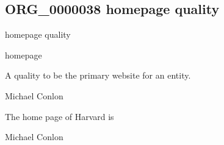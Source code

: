 \documentclass[letterpaper,10pt,english]{sphinxmanual}
\begin{document}
\subsection{ORG\_0000038 \sphinxhyphen{} homepage quality}
\label{\detokenize{doc-ORG_0000038:org-0000038-homepage-quality}}\label{\detokenize{doc-ORG_0000038:index-0}}\label{\detokenize{doc-ORG_0000038::doc}}
\begin{sphinxShadowBox}

\sphinxAtStartPar
homepage quality
\end{sphinxShadowBox}

\begin{sphinxShadowBox}

\sphinxAtStartPar
homepage
\end{sphinxShadowBox}

\begin{sphinxShadowBox}

\sphinxAtStartPar
{\hyperref[\detokenize{doc-BFO_0000019::doc}]{}}
\end{sphinxShadowBox}

\begin{sphinxShadowBox}

\sphinxAtStartPar
A quality to be the primary website for an entity.
\end{sphinxShadowBox}

\begin{sphinxShadowBox}

\sphinxAtStartPar
Michael Conlon 
\end{sphinxShadowBox}

\begin{sphinxShadowBox}

\sphinxAtStartPar
The home page of Harvard is 
\end{sphinxShadowBox}

\begin{sphinxShadowBox}

\sphinxAtStartPar
Michael Conlon 
\end{sphinxShadowBox}
\begin{quote}

\ignorespaces \end{quote}
\end{document}
